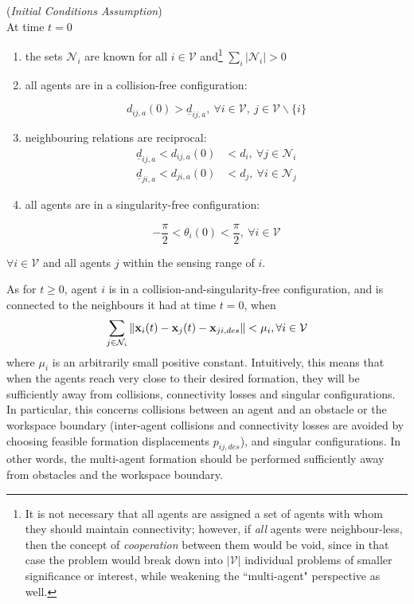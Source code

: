 \begin{gg_box}
\begin{assumption}(\textit{Initial Conditions Assumption})\\

  At time $t = 0$

  \begin{enumerate}

    \item the sets $\mathcal{N}_i$ are known for all $i \in \mathcal{V}$
      and\footnote{It is not necessary that
      all agents are assigned a set of agents with whom they should maintain
      connectivity; however, if \textit{all} agents were neighbour-less,
      then the concept of \textit{cooperation} between them would be void,
      since in that case the problem would break down into $|\mathcal{V}|$
      individual problems of smaller significance or interest, while
      weakening the ``multi-agent" perspective as well.}
      $\sum\limits_i |\mathcal{N}_i| > 0$

    \item all agents are in a collision-free configuration:

      $$ d_{ij,a}(0) > \underline{d}_{ij,a},\ \forall i \in \mathcal{V},\ j \in \mathcal{V}\backslash \{i\}$$

    \item neighbouring relations are reciprocal:
      \begin{align}
        \underline{d}_{ij,a} < d_{ij,a}(0) &< d_i,\ \forall j \in \mathcal{N}_i \\
        \underline{d}_{ji,a} < d_{ji,a}(0) &< d_j,\ \forall i \in \mathcal{N}_j
      \end{align}

    \item all agents are in a singularity-free configuration:

      $$ -\frac{\pi}{2} < \theta_i(0) < \frac{\pi}{2},\ \forall i \in \mathcal{V}$$

  \end{enumerate}
  $\forall i \in \mathcal{V}$ and all agents $j$ within the sensing range of $i$.
  \label{ass:initial_conditions}
\end{assumption}
\end{gg_box}


As for $t \geq 0$, agent $i$ is in a collision-and-singularity-free
configuration, and is connected to the neighbours it had at time $t = 0$,
when
$$\sum_{j \in \mathcal{N}_i} \| \bm{\mathbf{x}}_i(t) - \bm{\mathbf{x}}_j(t) - \bm{\mathbf{x}}_{ji,des}\| < \mu_i,
\forall i \in \mathcal{V}$$
where $\mu_i$ is an arbitrarily small positive constant. Intuitively, this
means that when the agents reach very close to their desired formation, they
will be sufficiently away from collisions, connectivity losses and singular
configurations. In particular, this concerns collisions between an agent and
an obstacle or the workspace boundary (inter-agent collisions and connectivity
losses are avoided by choosing feasible formation displacements $p_{ij,des}$),
and singular configurations. In other words, the multi-agent formation should be
performed sufficiently away from obstacles and the workspace boundary.

